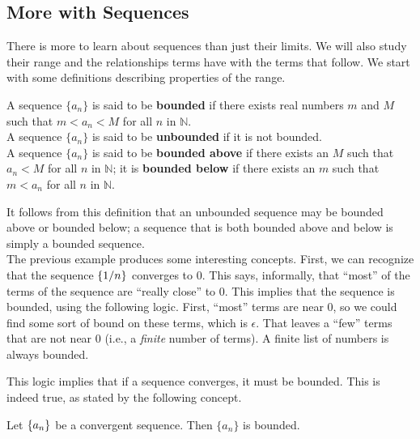 \subsection*{More with Sequences}
There is more to learn about sequences than just their limits. We will also study their range and the relationships terms have with the terms that follow. We start with some definitions describing properties of the range.

{A sequence $\{a_n\}$ is said to be \textbf{bounded} if there exists real numbers $m$ and $M$ such that $m < a_n < M$ for all $n$ in $\mathbb{N}$.\\

A sequence $\{a_n\}$ is said to be \textbf{unbounded} if it is not bounded.\\

A sequence $\{a_n\}$ is said to be \textbf{bounded above} if there exists an $M$ such that $a_n < M$ for all $n$ in $\mathbb{N}$; it is \textbf{bounded below} if there exists an $m$ such that $m<a_n$ for all $n$ in $\mathbb{N}$.
} %


It follows from this definition that an unbounded sequence may be bounded above or bounded below; a sequence that is both bounded above and below is simply a bounded sequence.\\



The previous example produces some interesting concepts. First, we can recognize that the sequence $\displaystyle\left\{1/n\right\}$ converges to 0. This says, informally, that ``most'' of the terms of the sequence are ``really close'' to 0. This implies that the sequence is bounded, using the following logic. First, ``most'' terms are near 0, so we could find some sort of bound on these terms, which is $\epsilon$. That leaves a ``few'' terms that are not near $0$ (i.e., a \emph{finite} number of terms). A finite list of numbers is always bounded. 

This logic implies that if a sequence converges, it must be bounded. This is indeed true, as stated by the following concept.

{Let $\displaystyle \left\{a_n\right\}$ be a convergent sequence. Then $\{a_n\}$ is bounded.
} %

